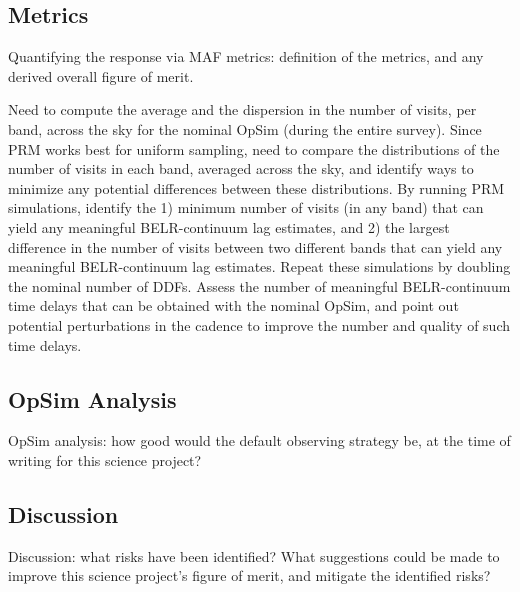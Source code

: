 
\subsection{Metrics}
\label{sec:\secname:metrics}

Quantifying the response via MAF metrics: definition of the metrics,
and any derived overall figure of merit.



Need to compute the average and the dispersion in the
number of visits, per band, across the sky for the nominal OpSim
(during the entire survey). Since PRM works best for uniform sampling,
need to compare the distributions of the number of visits in each
band, averaged across the sky, and identify ways to minimize any
potential differences between these distributions. By running PRM
simulations, identify the 1) minimum number of visits (in any band)
that can yield any meaningful BELR-continuum lag estimates, and 2) the
largest difference in the number of visits between two different bands
that can yield any meaningful BELR-continuum lag estimates. Repeat
these simulations by doubling the nominal number of DDFs. Assess the
number of meaningful BELR-continuum time delays that can be obtained
with the nominal OpSim, and point out potential perturbations in the
cadence to improve the number and quality of such time delays.




\subsection{OpSim Analysis}
\label{sec:\secname:analysis}

OpSim analysis: how good would the default observing strategy be, at
the time of writing for this science project?



\subsection{Discussion}
\label{sec:\secname:discussion}

Discussion: what risks have been identified? What suggestions could be
made to improve this science project's figure of merit, and mitigate
the identified risks?



\navigationbar
